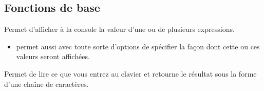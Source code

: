 \documentclass[10pt, french]{article}
\begin{document}
\begin{multicols*}{2}
\subsection{Fonctions de base}
\begin{definitionNOHFILLsub}
Permet d'afficher à la console la valeur d'une ou de plusieurs expressions.
\begin{itemize}
	\item	permet aussi avec toute sorte d'options de spécifier la façon dont cette ou ces valeurs seront affichées.
\end{itemize}
\end{definitionNOHFILLsub}

\begin{definitionNOHFILLsub}
Permet de lire ce que vous entrez au clavier et retourne le résultat sous la forme d'une chaîne de caractères.

\end{definitionNOHFILLsub}




\end{multicols*}
\end{document}
